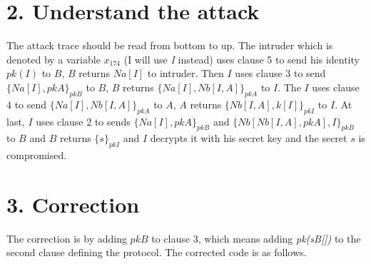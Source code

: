 \documentclass[a4paper, 12pt]{report}
\begin{document}
    \section*{2. Understand the attack}
        The attack trace should be read from bottom to up. The intruder which is denoted by a variable $x_{174}$ (I will use \emph{I} instead) uses clause 5 to send his identity $pk(I)$ to $B$, $B$ returns $Na[I]$ to intruder. Then $I$ uses clause 3 to send $\{Na[I],pkA\}_{pkB}$ to $B$, $B$ returns $\{Na[I],Nb[I,A]\}_{pkA}$ to $I$. The $I$ uses clause 4 to send $\{Na[I],Nb[I,A]\}_{pkA}$ to $A$, $A$ returns $\{Nb[I,A],k[I]\}_{pkI}$ to $I$. At last, $I$ uses clause 2 to sends $\{Na[I],pkA\}_{pkB}$ and
        $\{Nb[Nb[I,A],pkA], I\}_{pkB}$ to $B$ and $B$ returns $\{s\}_{pkI}$ and $I$ decrypts it with his secret key and the secret $s$ is compromised.
    \section*{3. Correction}
        The correction is by adding $pkB$ to clause 3, which means adding \emph{pk(sB[])} to the second clause defining the protocol. The corrected code is as follows.
\end{document}
